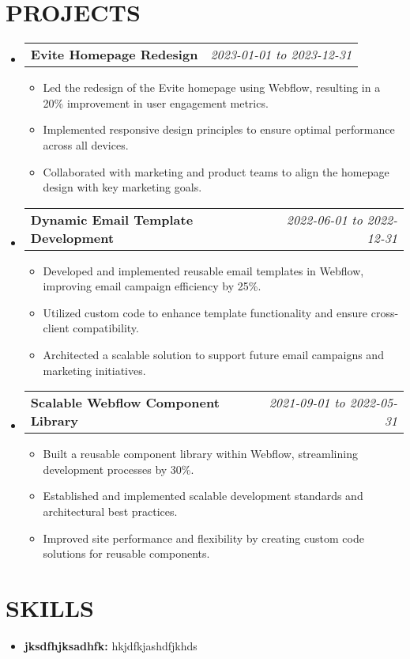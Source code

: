 \documentclass[letterpaper,11pt]{article}
\makeatletter
\newcommand{\resumeItem}[1]{\item\small{{#1 \vspace{-3pt}}}}
\newcommand{\resumeProjectHeading}[2]{\item\begin{tabular*}{0.97\textwidth}{l@{\extracolsep{\fill}}r}\small#1 & #2 \\\end{tabular*}\vspace{-7pt}}
\newcommand{\resumeSubHeadingListStart}{\begin{itemize}[leftmargin=0.15in, label={}]}
\newcommand{\resumeSubHeadingListEnd}{\end{itemize}}
\newcommand{\resumeItemListStart}{\begin{itemize}}
\newcommand{\resumeItemListEnd}{\end{itemize}\vspace{-5pt}}
\makeatother
\begin{document}
\section{{\fontsize{9pt}{20pt}\selectfont \textbf{PROJECTS}}}\resumeSubHeadingListStart
\resumeProjectHeading{\textbf{Evite Homepage Redesign}}{\textit{2023-01-01 to 2023-12-31}}
\resumeItemListStart
\resumeItem{Led the redesign of the Evite homepage using Webflow, resulting in a 20\% improvement in user engagement metrics.}
\resumeItem{Implemented responsive design principles to ensure optimal performance across all devices.}
\resumeItem{Collaborated with marketing and product teams to align the homepage design with key marketing goals.}
\resumeItemListEnd\vspace{-6pt}
\resumeProjectHeading{\textbf{Dynamic Email Template Development}}{\textit{2022-06-01 to 2022-12-31}}
\resumeItemListStart
\resumeItem{Developed and implemented reusable email templates in Webflow, improving email campaign efficiency by 25\%.}
\resumeItem{Utilized custom code to enhance template functionality and ensure cross-client compatibility.}
\resumeItem{Architected a scalable solution to support future email campaigns and marketing initiatives.}
\resumeItemListEnd\vspace{-6pt}
\resumeProjectHeading{\textbf{Scalable Webflow Component Library}}{\textit{2021-09-01 to 2022-05-31}}
\resumeItemListStart
\resumeItem{Built a reusable component library within Webflow, streamlining development processes by 30\%.}
\resumeItem{Established and implemented scalable development standards and architectural best practices.}
\resumeItem{Improved site performance and flexibility by creating custom code solutions for reusable components.}
\resumeItemListEnd
\resumeSubHeadingListEnd\vspace{-17pt}
\section{{\fontsize{9pt}{20pt}\selectfont \textbf{SKILLS}}}\resumeSubHeadingListStart
\resumeItem{\textbf{jksdfhjksadhfk:} hkjdfkjashdfjkhds}
\resumeSubHeadingListEnd\vspace{-10pt}
\end{document}
